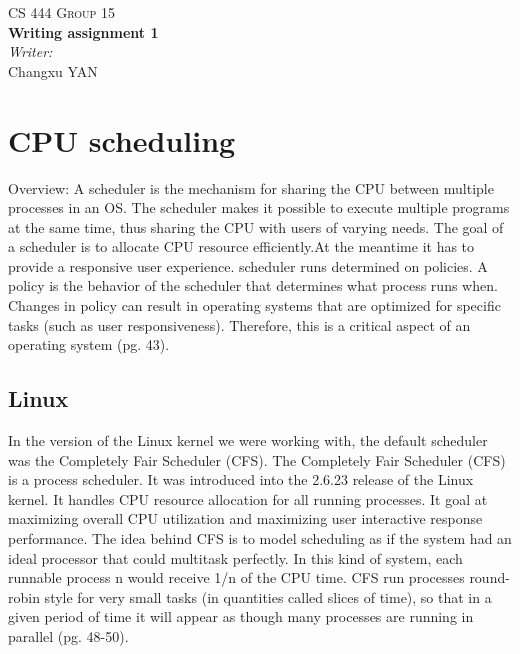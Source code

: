 \documentclass[letterpaper,10pt]{article}
\newcommand{\tab}{\hspace*{2em}} %
\begin{document}
\vfill
\begin{center}
    \textsc{\LARGE CS 444 Group 15}\\
    { \huge \bfseries Writing assignment 1 \\}
    \emph{Writer:}\\
    Changxu \textsc{YAN}
\end{center}


\section{CPU scheduling}
\tab Overview: A scheduler is the mechanism for sharing the CPU between multiple processes in an OS. The scheduler makes it possible to execute multiple programs at the same time, thus sharing the CPU with users of varying needs. The goal of a scheduler is to allocate CPU resource efficiently.At the meantime it has to provide a responsive user experience. scheduler runs determined on policies. A policy is the behavior of the scheduler that determines what process runs when. Changes in policy can result in operating systems that are optimized for specific tasks (such as user responsiveness). Therefore, this is a critical aspect of an operating system \cite{Love}(pg. 43).

\subsection{Linux}
\tab In the version of the Linux kernel we were working with, the default scheduler was the Completely Fair Scheduler (CFS). The Completely Fair Scheduler (CFS) is a process scheduler. It was introduced into the 2.6.23 release of the Linux kernel. It handles CPU resource allocation for all running processes. It goal at maximizing overall CPU utilization and maximizing user interactive response performance. The idea behind CFS is to model scheduling as if the system had an ideal processor that could multitask perfectly. In this kind of system, each runnable process n would receive 1/n of the CPU time. CFS run processes round-robin style for very small tasks (in quantities called slices of time), so that in a given period of time it will appear as though many processes are running in parallel \cite{Love}(pg. 48-50).
\end{document}
